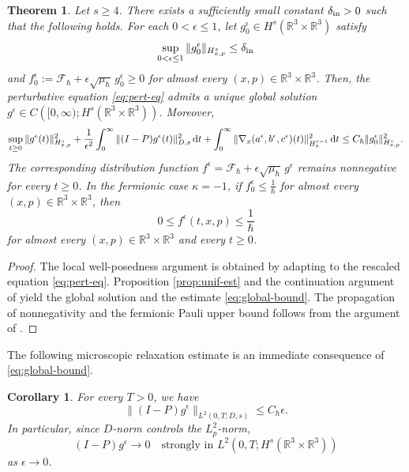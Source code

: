 \documentclass[10pt,reqno]{amsart}
\numberwithin{equation}{section}
\newtheorem{theorem}{Theorem}[section]
\newtheorem{corollary}{Corollary}[section]
\newcommand{\lt}{\left}
\newcommand{\rt}{\right}
\newcommand{\R}{\mathbb R}
\newcommand{\bq}{\begin{equation}}
\newcommand{\eq}{\end{equation}}
\newcommand{\calF}{\mathcal F}
\newcommand{\rdt}{\textnormal{d}t}
\begin{document}
\begin{theorem}\label{thm:scaled-global}
Let $s\ge4$. There exists a sufficiently small constant $\delta_{\rm in}>0$ such that the following holds. For each $0<\epsilon\le1$, let $g^\epsilon_0\in H^s(\R^3\times\R^3)$ satisfy
\[
\sup_{0<\epsilon\le1}\|g^\epsilon_0\|_{H^s_{x,p}}\le\delta_{\rm in}
\]
and $f^\epsilon_0:=\calF_\hbar+\epsilon\sqrt{\mu_\hbar}\,g^\epsilon_0\ge0$
for almost every $(x,p)\in\R^3\times\R^3$. Then, the perturbative equation \eqref{eq:pert-eq} admits a unique global solution $g^\epsilon\in C\lt([0,\infty);H^s(\R^3\times\R^3)\rt)$. Moreover,
\bq\label{eq:global-bound}
\sup_{t\ge0}\|g^\epsilon(t)\|_{H^s_{x,p}}^2+\frac{1}{\epsilon^2}\int_0^\infty\|(I-P)g^\epsilon(t)\|_{D,s}^2\,\rdt +\int_0^\infty\|\nabla_x(a^\epsilon,b^\epsilon,c^\epsilon)(t)\|_{H^{s-1}_x}^2\,\rdt\le C_\hbar\|g^\epsilon_0\|_{H^s_{x,p}}^2.
\eq
The corresponding distribution function $f^\epsilon=\calF_\hbar+\epsilon\sqrt{\mu_\hbar}\,g^\epsilon$ remains nonnegative for every $t\ge0$. In the fermionic case $\kappa=-1$, if $f^\epsilon_0\le\frac{1}{\hbar}$ for almost every $(x,p)\in\R^3\times\R^3$, then
\[
0\le f^\epsilon(t,x,p)\le\frac{1}{\hbar}
\]
for almost every $(x,p)\in\R^3\times\R^3$ and every $t\ge0$.
\end{theorem}

\begin{proof}
The local well-posedness argument is obtained by adapting \cite[Theorem 4.1]{CHHpre} to the rescaled equation \eqref{eq:pert-eq}. Proposition \ref{prop:unif-est} and the continuation argument of \cite[Section 6.1]{CHHpre} yield the global solution and the estimate \eqref{eq:global-bound}. The propagation of nonnegativity and the fermionic Pauli upper bound follows from the argument of \cite[Appendix A.2]{CHHpre}.
\end{proof}

The following microscopic relaxation estimate is an immediate consequence of \eqref{eq:global-bound}.

\begin{corollary}\label{cor:micro-relax}
For every $T>0$, we have
\bq\label{eq:micro-relax}
\|(I-P)g^\epsilon\|_{L^2(0,T;D,s)}\le C_\hbar\epsilon.
\eq
In particular, since $D$-norm controls the $L^2_p$-norm,
\[
(I-P)g^\epsilon\to0\quad\text{strongly in }L^2(0,T;H^s(\R^3\times\R^3))
\]
as $\epsilon\to0$.
\end{corollary}

%
%
%
%
%
%
%
%
%
%
\end{document}
